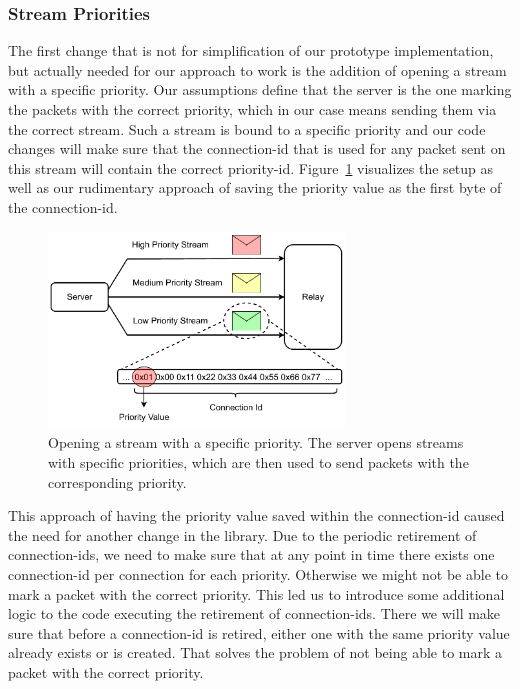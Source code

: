 \subsubsection*{Stream Priorities}
The first change that is not for simplification of our prototype implementation, but actually needed for 
our approach to work is the addition of opening a stream with a specific priority.
Our assumptions define that the server is the one marking the packets with the correct priority, which in 
our case means sending them via the correct stream.
Such a stream is bound to a specific priority and our code changes will make sure that the connection-id
that is used for any packet sent on this stream will contain the correct priority-id.
Figure~\ref{fig:priority-stream} visualizes the setup as well as our rudimentary approach of saving the 
priority value as the first byte of the connection-id.

\vspace{0.5cm}
\begin{figure}[H]
    \centering
    \includegraphics[width=0.7\textwidth]{figures/03_fast_relays/priority-streams.drawio.pdf}
    \caption[Opening a stream with a specific priority]{Opening a stream with a specific priority.
    The server opens streams with specific priorities, which are then used to send packets with the 
    corresponding priority.}\label{fig:priority-stream}
\end{figure}

This approach of having the priority value saved within the connection-id caused the need for another 
change in the library.
Due to the periodic retirement of connection-ids, we need to make sure that at any point in time there 
exists one connection-id per connection for each priority.
Otherwise we might not be able to mark a packet with the correct priority.
This led us to introduce some additional logic to the code executing the retirement of connection-ids.
There we will make sure that before a connection-id is retired, either one with the same priority value
already exists or is created.
That solves the problem of not being able to mark a packet with the correct priority.

